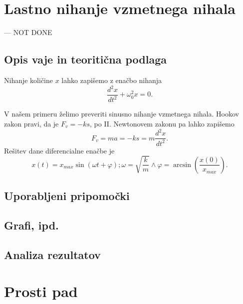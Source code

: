 \documentclass[12pt]{article}
\begin{document}
\section{Lastno nihanje vzmetnega nihala}  --- NOT DONE
	\subsection*{Opis vaje in teoritična podlaga}
	Nihanje količine $x$ lahko zapišemo z enačbo nihanja
	\begin{equation}
		\frac{d^2 x}{dt^2} + \omega_0^2 x = 0 .
	\end{equation}

 

	V našem primeru želimo preveriti sinusno nihanje vzmetnega nihala.
	Hookov zakon pravi, da je $F_v = -ks$, po II. Newtonovem zakonu pa lahko zapišemo 
	\begin{equation}
		F_v = ma = -ks = m \frac{d^2 x}{dt^2} .
	\end{equation}
	Rešitev dane diferencialne enačbe je
	\begin{equation}
		x(t) = x_{max} \sin(\omega t + \varphi); \omega = \sqrt{\frac k m} \land \varphi = \arcsin(\frac{x(0)}{x_{max}}).
	\end{equation}
	\newpage
	
	

	\subsection*{Uporabljeni pripomočki}
	\subsection*{Grafi, ipd.}
	\subsection*{Analiza rezultatov}

\newpage
\section{Prosti pad}
\end{document}
